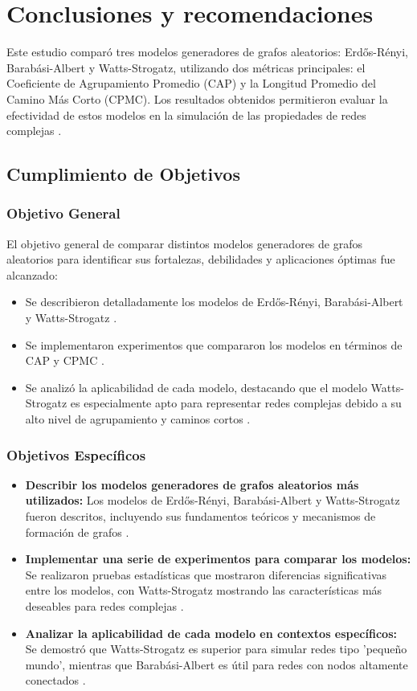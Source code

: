 \chapter{Conclusiones y recomendaciones}

Este estudio comparó tres modelos generadores de grafos aleatorios: Erdős-Rényi, Barabási-Albert y Watts-Strogatz, utilizando dos métricas principales: el Coeficiente de Agrupamiento Promedio (CAP) y la Longitud Promedio del Camino Más Corto (CPMC). Los resultados obtenidos permitieron evaluar la efectividad de estos modelos en la simulación de las propiedades de redes complejas .

\section{Cumplimiento de Objetivos}

\subsection{Objetivo General}

El objetivo general de comparar distintos modelos generadores de grafos aleatorios para identificar sus fortalezas, debilidades y aplicaciones óptimas fue alcanzado:

\begin{itemize}
    \item Se describieron detalladamente los modelos de Erdős-Rényi, Barabási-Albert y Watts-Strogatz .
    \item Se implementaron experimentos que compararon los modelos en términos de CAP y CPMC .
    \item Se analizó la aplicabilidad de cada modelo, destacando que el modelo Watts-Strogatz es especialmente apto para representar redes complejas debido a su alto nivel de agrupamiento y caminos cortos .
\end{itemize}

\subsection{Objetivos Específicos}

\begin{itemize}
    \item \textbf{Describir los modelos generadores de grafos aleatorios más utilizados:} Los modelos de Erdős-Rényi, Barabási-Albert y Watts-Strogatz fueron descritos, incluyendo sus fundamentos teóricos y mecanismos de formación de grafos .
    \item \textbf{Implementar una serie de experimentos para comparar los modelos:} Se realizaron pruebas estadísticas que mostraron diferencias significativas entre los modelos, con Watts-Strogatz mostrando las características más deseables para redes complejas .
    \item \textbf{Analizar la aplicabilidad de cada modelo en contextos específicos:} Se demostró que Watts-Strogatz es superior para simular redes tipo 'pequeño mundo', mientras que Barabási-Albert es útil para redes con nodos altamente conectados .
\end{itemize}

